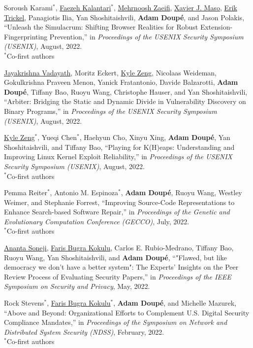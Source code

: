 \documentclass[11pt,letterpaper,sans]{moderncv}
\begin{document}
\begin{etaremune}
  
\item Soroush Karami$^*$,  \underline{Faezeh Kalantari}$^*$, \underline{Mehrnoosh Zaeifi},  \underline{Xavier J. Maso},  \underline{Erik Trickel},  Panagiotis Ilia,  Yan Shoshitaishvili,  \textbf{Adam Doup\'e}, and  Jason Polakis, ``Unleash the Simulacrum: Shifting Browser Realities for Robust Extension-Fingerprinting Prevention,'' in \emph{Proceedings of the USENIX Security Symposium (USENIX)}, August, 2022. \\
  $^*$Co-first authors
  
\item \underline{Jayakrishna Vadayath},  Moritz Eckert,  \underline{Kyle Zeng},  Nicolaas Weideman,  Gokulkrishna Praveen Menon,  Yanick Fratantonio,  Davide Balzarotti,  \textbf{Adam Doup\'e},  Tiffany Bao,  Ruoyu Wang, Christophe Hauser, and  Yan Shoshitaishvili, ``Arbiter: Bridging the Static and Dynamic Divide in Vulnerability Discovery on Binary Programs,'' in \emph{Proceedings of the USENIX Security Symposium (USENIX)}, August, 2022.
  
\item \underline{Kyle Zeng}$^*$,  Yueqi Chen$^*$,  Haehyun Cho,  Xinyu Xing,  \textbf{Adam Doup\'e},  Yan Shoshitaishvili, and Tiffany Bao, ``Playing for K(H)eaps: Understanding and Improving Linux Kernel Exploit Reliability,'' in \emph{Proceedings of the USENIX Security Symposium (USENIX)}, August, 2022. \\
  $^*$Co-first authors

\item Pemma Reiter$^*$,  Antonio M. Espinoza$^*$,  \textbf{Adam Doup\'e},  Ruoyu Wang,  Westley Weimer, and Stephanie Forrest, ``Improving Source-Code Representations to Enhance Search-based Software Repair,'' in \emph{Proceedings of the Genetic and Evolutionary Computation Conference (GECCO)}, July, 2022. \\
  $^*$Co-first authors
  
\item \underline{Ananta Soneji},  \underline{Faris Bugra Kokulu},  Carlos E. Rubio-Medrano,  Tiffany Bao,  Ruoyu Wang,  Yan Shoshitaishvili, and  \textbf{Adam Doup\'e}, ``"Flawed, but like democracy we don't have a better system": The Experts' Insights on the Peer Review Process of Evaluating Security Papers,'' in \emph{Proceedings of the IEEE Symposium on Security and Privacy}, May, 2022.
  
\item Rock Stevens$^*$,  \underline{Faris Bugra Kokulu}$^*$,  \textbf{Adam Doup\'e}, and  Michelle Mazurek,  ``Above and Beyond: Organizational Efforts to Complement U.S. Digital Security Compliance Mandates,'' in \emph{Proceedings of the Symposium on Network and Distributed System Security (NDSS)}, February, 2022. \\
  $^*$Co-first authors
  

\end{etaremune}
\end{document}
